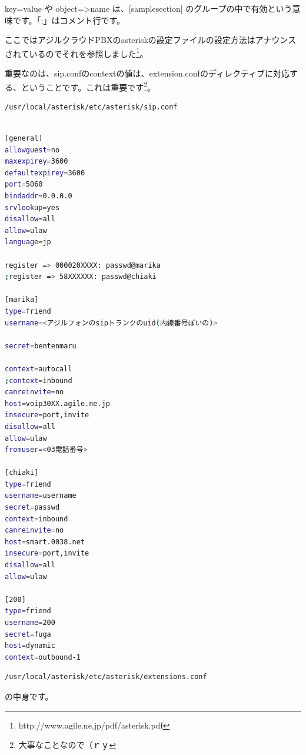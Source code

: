 key=value や object=>name は、[samplesection] のグループの中で有効という意味です。「;」はコメント行です。

ここではアジルクラウドPBXのasteriskの設定ファイルの設定方法はアナウンスされているのでそれを参照しました\footnote{http://www.agile.ne.jp/pdf/asterisk.pdf}。

重要なのは、sip.confのcontextの値は、extension.confのディレクティブに対応する、ということです。これは重要です\footnote{大事なことなので（ｒｙ}。

\begin{lstlisting}[language=bash]
/usr/local/asterisk/etc/asterisk/sip.conf
\end{lstlisting}

\begin{lstlisting}[language=bash]

[general]
allowguest=no
maxexpirey=3600
defaultexpirey=3600
port=5060
bindaddr=0.0.0.0
srvlookup=yes
disallow=all
allow=ulaw
language=jp

register => 000020XXXX: passwd@marika
;register => 58XXXXXX: passwd@chiaki

[marika]
type=friend
username=<アジルフォンのsipトランクのuid(内線番号ぽいの)>

secret=bentenmaru

context=autocall
;context=inbound
canreinvite=no
host=voip30XX.agile.ne.jp
insecure=port,invite
disallow=all
allow=ulaw
fromuser=<03電話番号>

[chiaki]
type=friend
username=username
secret=passwd
context=inbound
canreinvite=no
host=smart.0038.net
insecure=port,invite
disallow=all
allow=ulaw

[200]
type=friend
username=200
secret=fuga
host=dynamic
context=outbound-1
\end{lstlisting}


\begin{lstlisting}[language=bash]
/usr/local/asterisk/etc/asterisk/extensions.conf
\end{lstlisting}
の中身です。

